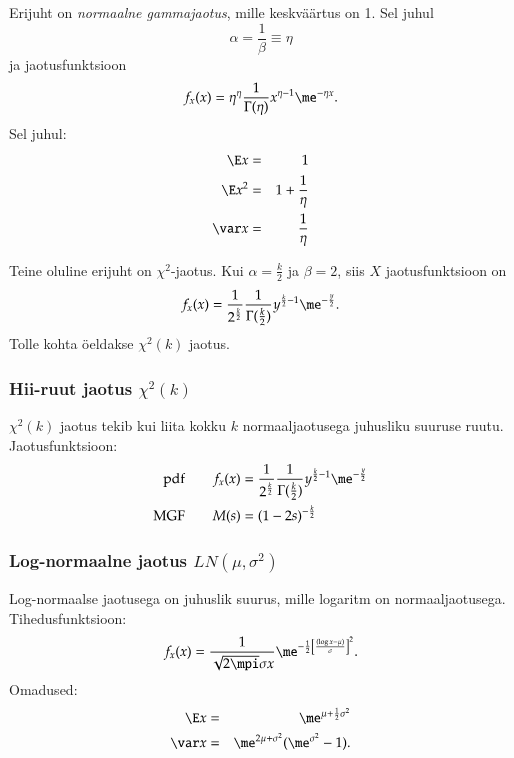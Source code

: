 \documentclass[a4paper]{article}
\numberwithin{equation}{subsection}
\begin{document}
Erijuht on \emph{normaalne gammajaotus}, mille keskväärtus on 1.  Sel
juhul 
\begin{equation}
\alpha = \frac{1}{\beta} \equiv \eta
\end{equation}
ja jaotusfunktsioon
\begin{equation}
f_x(x) = \eta^\eta \frac{1}{\Gamma(\eta)} x^{\eta - 1} \me^{-\eta x}.
\end{equation}
Sel juhul:
\begin{eqnarray}
  \E x &=& 1\\
  \E x^2 &=& 1 + \frac{1}{\eta}\\
  \var x &=& \frac{1}{\eta}
\end{eqnarray}

Teine oluline erijuht on $\chi^2$-jaotus.  Kui $\alpha=\frac{k}{2}$ ja
$\beta=2$, siis $X$ jaotusfunktsioon on
\begin{equation}
f_x (x) = \frac{1}{2^\frac{k}{2}} \frac{1}{\Gamma(\frac{k}{2})}
  y^{\frac{k}{2} - 1} \me^{-\frac{y}{2}}.
\end{equation}
Tolle kohta öeldakse $\chi^2(k)$ jaotus.


\subsubsection{Hii-ruut jaotus $\chi^2(k)$}
$\chi^2 (k)$ jaotus tekib kui liita kokku $k$ normaaljaotusega
juhusliku suuruse ruutu.  Jaotusfunktsioon:
\begin{align}
\text{pdf}
\qquad &
f_x (x) = \frac{1}{2^\frac{k}{2}} \frac{1}{\Gamma(\frac{k}{2})}
  y^{\frac{k}{2} - 1} \me^{-\frac{y}{2}}
\\
\text{MGF}
\qquad &
M(s) = (1 - 2s)^{-\frac{k}{2}}
\end{align}


\subsubsection{Log-normaalne jaotus $LN(\mu,\sigma^2)$}
Log-normaalse jaotusega on juhuslik suurus, mille logaritm on
normaaljaotusega.  Tihedusfunktsioon:
\begin{equation}
f_x (x) = \frac{1}{\sqrt{2\mpi}\sigma x}
  \me^{-\frac{1}{2}\left[\frac{(\log x - \mu)}{\sigma}\right]^2}.
\end{equation}
Omadused:
\begin{eqnarray}
\E x &=& \me^{\mu + \frac{1}{2}\sigma^2}\\
\var x &=& \me^{2\mu + \sigma^2} (\me^{\sigma^2} - 1).
\end{eqnarray}
\end{document}
